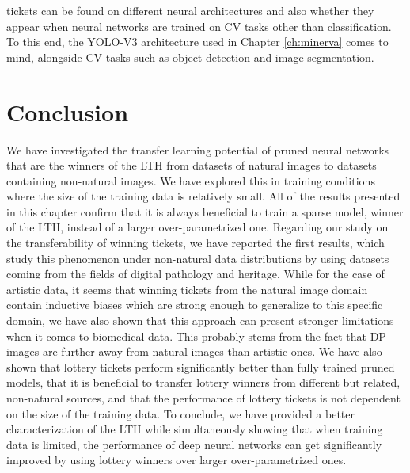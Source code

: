 tickets can be found on different neural architectures and also whether they appear when neural networks are trained on CV tasks other than classification. To this end, the YOLO-V3 architecture used in Chapter \ref{ch:minerva} comes to mind, alongside CV tasks such as object detection and image segmentation.

\section{Conclusion}
\label{sec:conclusion}
We have investigated the transfer learning potential of pruned neural networks that are the winners of the LTH from datasets of natural images to datasets containing non-natural images. We have explored this in training conditions where the size of the training data is relatively small. All of the results presented in this chapter confirm that it is always beneficial to train a sparse model, winner of the LTH, instead of a larger over-parametrized one. Regarding our study on the transferability of winning tickets, we have reported the first results, which study this phenomenon under non-natural data distributions by using datasets coming from the fields of digital pathology and heritage. While for the case of artistic data, it seems that winning tickets from the natural image domain contain inductive biases which are strong enough to generalize to this specific domain, we have also shown that this approach can present stronger limitations when it comes to biomedical data. This probably stems from the fact that DP images are further away from natural images than artistic ones. We have also shown that lottery tickets perform significantly better than fully trained pruned models, that it is beneficial to transfer lottery winners from different but related, non-natural sources, and that the performance of lottery tickets is not dependent on the size of the training data. To conclude, we have provided a better characterization of the LTH while simultaneously showing that when training data is limited, the performance of deep neural networks can get significantly improved by using lottery winners over larger over-parametrized ones.


